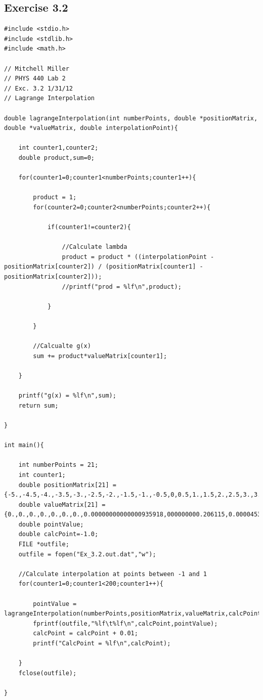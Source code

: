 \documentclass[12pt]{article}
\begin{document}
\subsection{Exercise 3.2}
\begin{verbatim}
#include <stdio.h>
#include <stdlib.h>
#include <math.h>

// Mitchell Miller
// PHYS 440 Lab 2
// Exc. 3.2 1/31/12
// Lagrange Interpolation

double lagrangeInterpolation(int numberPoints, double *positionMatrix, double *valueMatrix, double interpolationPoint){

	int counter1,counter2;
	double product,sum=0;

	for(counter1=0;counter1<numberPoints;counter1++){

		product = 1;
		for(counter2=0;counter2<numberPoints;counter2++){

			if(counter1!=counter2){

				//Calculate lambda
				product = product * ((interpolationPoint - positionMatrix[counter2]) / (positionMatrix[counter1] - positionMatrix[counter2]));
				//printf("prod = %lf\n",product);

			}
			
		}

		//Calcualte g(x)
		sum += product*valueMatrix[counter1];

	}

	printf("g(x) = %lf\n",sum);
	return sum;

}

int main(){

	int numberPoints = 21;
	int counter1;
	double positionMatrix[21] = {-5.,-4.5,-4.,-3.5,-3.,-2.5,-2.,-1.5,-1.,-0.5,0,0.5,1.,1.5,2.,2.5,3.,3.5,4.,4.5,5.};
	double valueMatrix[21] = {0.,0.,0.,0.,0.,0.,0.,0.00000000000000935918,000000000.206115,0.0000453979,0.5,0.999955,1.,1.,1.,1.,1.,1.,1.,1.};
	double pointValue;
	double calcPoint=-1.0;
	FILE *outfile;
	outfile = fopen("Ex_3.2.out.dat","w");

	//Calculate interpolation at points between -1 and 1
	for(counter1=0;counter1<200;counter1++){
		
		pointValue = lagrangeInterpolation(numberPoints,positionMatrix,valueMatrix,calcPoint);
		fprintf(outfile,"%lf\t%lf\n",calcPoint,pointValue);
		calcPoint = calcPoint + 0.01;
		printf("CalcPoint = %lf\n",calcPoint);

	}
	fclose(outfile);

}
\end{verbatim}
\end{document}
